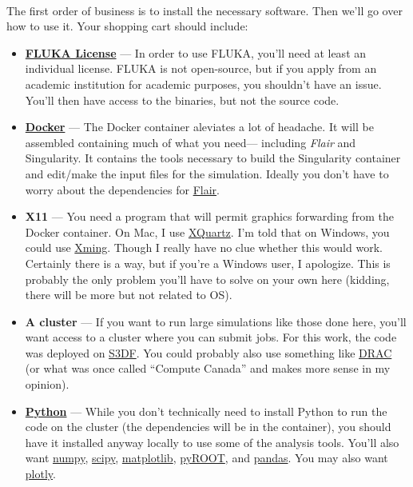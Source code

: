     \paragraph{}
    The first order of business is to install the necessary software. Then we'll go over how to use it. Your shopping cart should include:
    \begin{itemize}
        \item{\textbf{\href{https://fluka.cern/download/licences}{FLUKA License}}} — In order to use FLUKA, you'll need at least an individual license. FLUKA is not open-source, but if you apply from an academic institution for academic purposes, you shouldn't have an issue. You'll then have access to the binaries, but not the source code.
        \item{\textbf{\href{https://www.docker.com/}{Docker}}} — The Docker container aleviates a lot of headache. It will be assembled containing much of what you need— including \textit{Flair} and Singularity. It contains the tools necessary to build the Singularity container and edit/make the input files for the simulation. Ideally you don't have to worry about the dependencies for \href{https://flair.web.cern.ch/flair/}{Flair}.
        \item{\textbf{X11}} — You need a program that will permit graphics forwarding from the Docker container. On Mac, I use \href{https://www.xquartz.org/}{XQuartz}. I'm told that on Windows, you could use \href{http://www.straightrunning.com/XmingNotes/}{Xming}. Though I really have no clue whether this would work. Certainly there is a way, but if you're a Windows user, I apologize. This is probably the only problem you'll have to solve on your own here (kidding, there will be more but not related to OS).
        \item{\textbf{A cluster}} — If you want to run large simulations like those done here, you'll want access to a cluster where you can submit jobs. For this work, the code was deployed on \href{https://s3df.slac.stanford.edu}{S3DF}. You could probably also use something like \href{https://alliancecan.ca/en}{DRAC} (or what was once called ``Compute Canada'' and makes more sense in my opinion).
        \item{\href{https://www.python.org}{\textbf{Python}}} — While you don't technically need to install Python to run the code on the cluster (the dependencies will be in the container), you should have it installed anyway locally to use some of the analysis tools. You'll also want \href{https://www.numpy.org}{numpy}, \href{https://www.scipy.org}{scipy}, \href{https://matplotlib.org}{matplotlib}, \href{https://root.cern/manual/python/}{pyROOT}, and \href{https://pandas.pydata.org/}{pandas}. You may also want \href{https://plotly.com/python/}{plotly}.
    \end{itemize}

